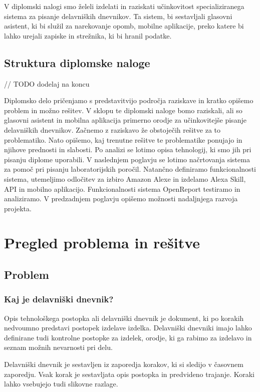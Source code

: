 \documentclass[a4paper, 12pt]{book}
\begin{document}
V diplomski nalogi smo želeli izdelati in raziskati učinkovitost specializiranega sistema za pisanje delavniških dnevnikov.
Ta sistem, bi sestavljali glasovni asistent, ki bi služil za narekovanje opomb, mobilne aplikacije, preko katere bi lahko urejali zapiske in strežnika, ki bi hranil podatke.

\section{Struktura diplomske naloge}

// TODO dodelaj na koncu

Diplomsko delo pričenjamo s predstavitvijo področja raziskave in kratko opišemo problem in možno rešitev. 
V sklopu te diplomski naloge bomo raziskali, ali so glasovni asistent in mobilna aplikacija primerno orodje za učinkovitejše pisanje delavniških dnevnikov.
Začnemo z raziskavo že obstoječih rešitve za to problematiko.
Nato opišemo, kaj trenutne rešitve te problematike ponujajo in njihove prednosti in slabosti.
Po analizi se lotimo opisa tehnologij, ki smo jih pri pisanju diplome uporabili.
V naslednjem poglavju se lotimo načrtovanja sistema za pomoč pri pisanju laboratorijskih poročil.
Natančno definiramo funkcionalnosti sistema, utemeljimo odločitev za izbiro Amazon Alexe in izdelamo Alexa Skill, API in mobilno aplikacijo.
Funkcionalnosti sistema OpenReport testiramo in analiziramo.
V predzadnjem poglavju opišemo možnosti nadaljnjega razvoja projekta.

\chapter{Pregled problema in rešitve}

\section{Problem}

\subsection {Kaj je delavniški dnevnik?}

Opis tehnološkega postopka ali delavniški dnevnik je dokument, ki po korakih nedvoumno predstavi postopek izdelave izdelka.
Delavniški dnevniki imajo lahko definirane tudi kontrolne postopke za izdelek, orodje, ki ga rabimo za izdelavo in seznam možnih nevarnosti pri delu.

Delavniški dnevnik je sestavljen iz zaporedja korakov, ki si sledijo v časovnem zaporedju.
Vsak korak je sestavljata opis postopka in predvideno trajanje.
Koraki lahko vsebujejo tudi slikovne razlage.
\end{document}
